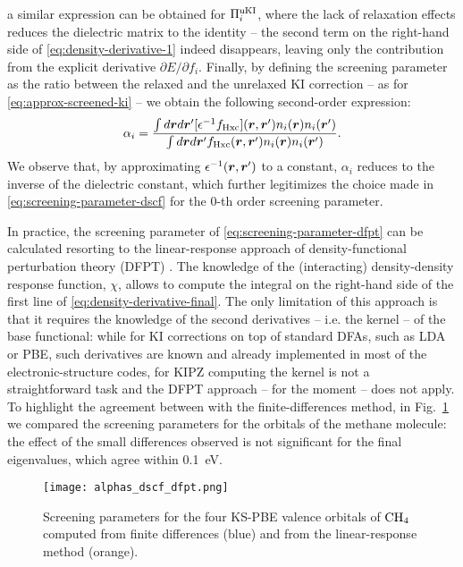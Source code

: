 %
a similar expression can be obtained for $\Pi_i^{\rm uKI}$, where the lack of relaxation effects reduces the dielectric matrix to the identity -- the second term on the right-hand side of \cref{eq:density-derivative-1} indeed disappears, leaving only the contribution from the explicit derivative $\partial E / \partial f_i$. Finally, by defining the screening parameter as the ratio between the relaxed and the unrelaxed KI correction -- as for \cref{eq:approx-screened-ki} -- we obtain the following second-order expression:
%
\begin{equation}
    \alpha_i = \frac{\int d{\bm r} d{\bm r}' [\epsilon^{-1} f_{\rm Hxc}]({\bm r},{\bm r}') n_i({\bm r}) n_i({\bm r}')}{\int d{\bm r} d{\bm r}' f_{\rm Hxc}({\bm r},{\bm r}') n_i({\bm r}) n_i({\bm r}')} .
    \label{eq:screening-parameter-dfpt}
\end{equation}
%
We observe that, by approximating $\epsilon^{-1}({\bm r},{\bm r}')$ to a constant, $\alpha_i$ reduces to the inverse of the dielectric constant, which further legitimizes the choice made in \cref{eq:screening-parameter-dscf} for the 0-th order screening parameter.

In practice, the screening parameter of \cref{eq:screening-parameter-dfpt} can be calculated resorting to the linear-response approach of density-functional perturbation theory (DFPT) \cite{colonna_screening_2018}. The knowledge of the (interacting) density-density response function, $\chi$, allows to compute the integral on the right-hand side of the first line of \cref{eq:density-derivative-final}. The only limitation of this approach is that it requires the knowledge of the second derivatives -- i.e. the kernel -- of the base functional: while for KI corrections on top of standard DFAs, such as LDA or PBE, such derivatives are known and already implemented in most of the electronic-structure codes, for KIPZ computing the kernel is not a straightforward task and the DFPT approach -- for the moment -- does not apply. To highlight the agreement between with the finite-differences method, in Fig.~\ref{fig:alphas-dscf-dfpt} we compared the screening parameters for the orbitals of the methane molecule: the effect of the small differences observed is not significant for the final eigenvalues, which agree within 0.1~eV. 

\begin{figure}
    \centering
    \texttt{[image: alphas\_dscf\_dfpt.png]}
    \caption[Comparison of screening parameters from $\Delta$SCF and DFPT]{Screening parameters for the four KS-PBE valence orbitals of ${\rm CH}_4$ computed from finite differences (blue) and from the linear-response method (orange).}
    \label{fig:alphas-dscf-dfpt}
\end{figure}

